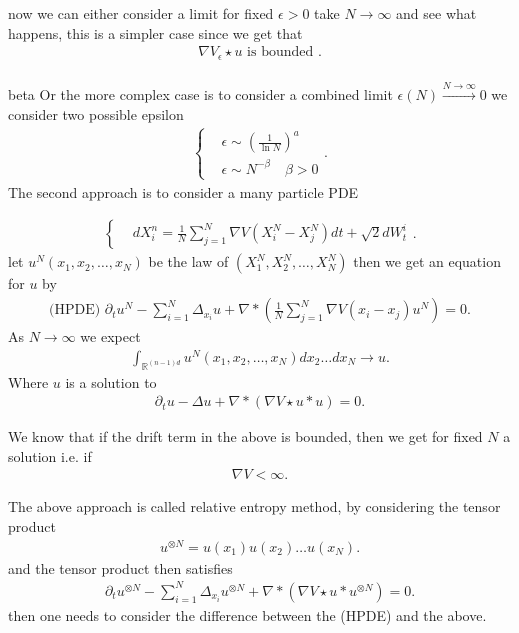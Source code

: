 now we can either consider a limit for fixed $\epsilon > 0$ take $N\to \infty$ and see what happens, this is a simpler case since we get that 
\begin{align*}
  \nabla V_\epsilon \star  u  \text{ is bounded }
.\end{align*}
\\[1ex]beta
Or the more complex case is to consider a combined limit $\epsilon(N) \xrightarrow{N\to \infty} 0$ we consider two possible epsilon
\begin{align*}
  \begin{cases}
    &\epsilon \sim (\frac{1}{\ln N})^{a} \\
    &\epsilon \sim N^{-\beta }  \quad \beta  > 0
  \end{cases}
.\end{align*}
The second approach is to consider a many particle PDE 
\begin{definition}
\begin{align*}
  \begin{cases}
    &dX_i^n = \frac{1}{N} \sum_{j=1}^{N}   \nabla V(X_i^{N}-X_j^{N}  )dt + \sqrt{2}dW_t^i 
  \end{cases}
.\end{align*}  
let $u^{N} (x_{1},x_{2},\ldots,x_N ) $ be the law of $(X_1^{N},X_2^{N},\ldots ,X_N^{N})$ then we get an equation for $u$ by 
\begin{align*}
  \text{(HPDE) }\partial_t u^{N}  - \sum_{i=1}^{N}  \Delta_{x_i} u + \nabla * (\frac{1}{N} \sum_{j=1}^{N} \nabla V(x_i-x_j) u^{N} ) = 0
.\end{align*}
As $N\to \infty$ we expect 
\begin{align*}
  \int_{\mathbb{R}^{(n-1)d} } u^{N} (x_{1},x_{2},\ldots,x_N ) dx_{2}\ldots dx_N \to u
.\end{align*}
Where $u$ is a solution to 
\begin{align*}
  \partial_t u - \Delta  u  + \nabla * (\nabla V \star u * u) = 0
.\end{align*}
\end{definition}
\begin{remark}
 We know that if the drift term in the above is bounded, then we get for fixed $N$ a solution i.e. if 
 \begin{align*}
  \nabla V < \infty
 .\end{align*}
\end{remark}
\begin{remark}
 The above approach is called relative entropy method, by considering the tensor product
 \begin{align*}
  u^{\otimes N}  = u(x_{1})u(x_{2})\ldots u(x_N)
 .\end{align*}
and the tensor product then satisfies 
\begin{align*}
  \partial_t u^{\otimes N}  -\sum_{i=1}^{N}  \Delta_{x_i}u^{\otimes N} + \nabla * (\nabla V \star  u * u^{\otimes N} )  = 0
.\end{align*}
then one needs to consider the difference between the (HPDE) and the above.
\end{remark}

